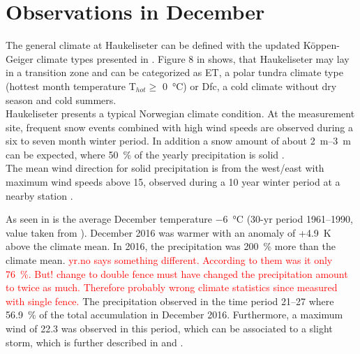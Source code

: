 \section{Observations in December}\label{sec:int:dec_obs}
The general climate at Haukeliseter can be defined with the updated K\"oppen-Geiger climate types presented in \cite{peel_updated_2007}. Figure 8 in \cite{peel_updated_2007} shows, that Haukeliseter may lay in a transition zone and can be categorized as  ET, a polar tundra climate type (hottest month temperature T$_{hot}\ge$ \SI{0}{\celsius}) or Dfc, a cold climate without dry season and cold summers. 
\\
Haukeliseter presents a typical Norwegian climate condition. At the measurement site, frequent snow events combined with high wind speeds are observed during a six to seven month winter period. In addition a snow amount of about \SIrange{2}{3}{\m} can be expected, where \SI{50}{\percent} of the yearly precipitation is solid \citep{wolff_new_2010, wolff_measurements_2013, wolff_derivation_2015}. \\
The mean wind direction for solid precipitation is from the west/east with maximum wind speeds above \SI{15}{\mPs}, observed during a 10 year winter period at a nearby station \citep{wolff_new_2010, wolff_derivation_2015}. 

\noindent As seen in  is the average December temperature \SI{-6}{\celsius} (30-yr period \numrange{1961}{1990}, value taken from \cite{eklima_norwegian_2016}).
December 2016 was warmer with an anomaly of +\SI{4.9}{\kelvin} above the climate mean. 
In 2016, the precipitation was \SI{200}{\percent} more than the climate mean. \textcolor{red}{yr.no says something different. According to them was it only \SI{76}{\percent}. But! change to double fence must have changed the precipitation amount to twice as much. Therefore probably wrong climate statistics since measured with single fence.} 
The precipitation observed in the time period \SIrange{21}{27}{\dec} where \SI{56.9}{\percent} of the total accumulation in December 2016. Furthermore, a maximum wind of \SI{22.3}{\mPs} was observed in this period, which can be associated to a slight storm, which is further described in  and .